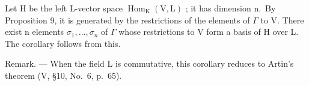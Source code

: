 Let H be the left L-vector space \(\operatorname{Hom}_{\mathrm{K}}(\mathrm{V},\mathrm{L})\) ; it has dimension n.~By Proposition 9, it is generated by the restrictions of the elements of \(\Gamma\) to V. There exist n elements \(\sigma_{1},\ldots,\sigma_{n}\) of \(\Gamma\) whose restrictions to V form a basis of H over L. The corollary follows from this.

Remark. --- When the field L is commutative, this corollary reduces to Artin's theorem (V, §10, No.~6, p.~65).

